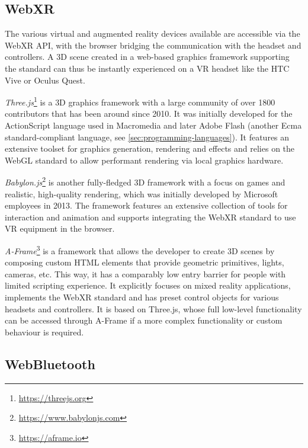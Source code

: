 \subsection{WebXR}
\label{subsec:webxr}

The various virtual and augmented reality devices available are accessible via the \ac{WebXR} \ac{API}, with the browser bridging the communication with the headset and controllers.
A \ac{3D} scene created in a web-based graphics framework supporting the standard can thus be instantly experienced on a \ac{VR} headset like the HTC Vive or Oculus Quest.



\emph{Three.js}\footnote{\url{https://threejs.org}} is a \ac{3D} graphics framework with a large community of over 1800 contributors that has been around since 2010.
It was initially developed for the ActionScript language used in Macromedia and later Adobe Flash (another Ecma standard-compliant language, see \autoref{sec:programming-languages}).
It features an extensive toolset for graphics generation, rendering and effects and relies on the WebGL standard to allow performant rendering via local graphics hardware.

\emph{Babylon.js}\footnote{\url{https://www.babylonjs.com}} is another fully-fledged \ac{3D} framework with a focus on games and realistic, high-quality rendering, which was initially developed by Microsoft employees in 2013.
The framework features an extensive collection of tools for interaction and animation and supports integrating the \ac{WebXR} standard to use \ac{VR} equipment in the browser.

\emph{A-Frame}\footnote{\url{https://aframe.io}} is a framework that allows the developer to create \ac{3D} scenes by composing custom \ac{HTML} elements that provide geometric primitives, lights, cameras, etc.
This way, it has a comparably low entry barrier for people with limited scripting experience.
It explicitly focuses on mixed reality applications, implements the WebXR standard and has preset control objects for various headsets and controllers.
It is based on Three.js, whose full low-level functionality can be accessed through A-Frame if a more complex functionality or custom behaviour is required.

\subsection{WebBluetooth}
\label{subsec:webbluetooth}

